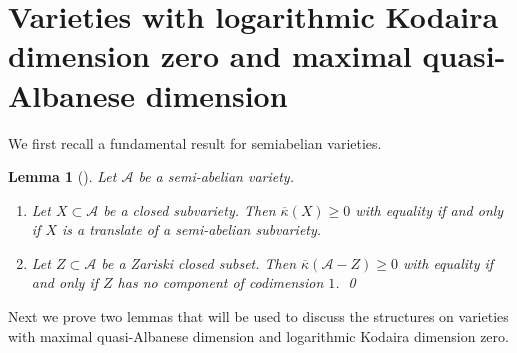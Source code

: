 \documentclass[11pt,english]{smfart}
\theoremstyle{plain}
\newtheorem{lem}[thm]{Lemma}
\theoremstyle{definition}
\theoremstyle{remark}
\numberwithin{equation}{section}
\theoremstyle{plain}
\newcommand{\cA}{\mathcal A}
\begin{document}
 \section{Varieties with logarithmic Kodaira dimension zero and maximal quasi-Albanese dimension} \label{sec:quasi} 
We first recall a fundamental result for semiabelian varieties. 
\begin{lem}[] \label{prop:Koddimabb}
	Let \(\cA\) be a semi-abelian variety. 
	\begin{enumerate}[label=(\alph*)]
		\item Let \(X \subset \cA\) be a closed subvariety. Then \(\overline{\kappa}(X) \geq 0\) with equality if and only if \(X\) is a translate of a semi-abelian subvariety.
		\item Let \(Z \subset \cA\) be a Zariski closed subset. Then \(\overline{\kappa}(\cA - Z) \geq 0\) with equality if and only if \(Z\) has no component of codimension \(1\).  \qed
	\end{enumerate}
\end{lem}


Next we prove two lemmas that will be used to discuss the structures on varieties with maximal quasi-Albanese dimension and logarithmic Kodaira dimension zero.
\end{document}
